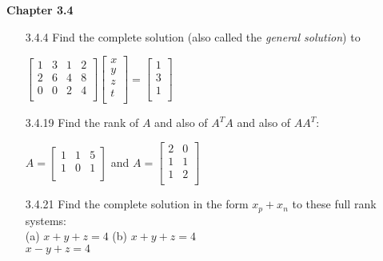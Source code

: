 \documentclass[10pt,twoside,reqno]{article}
\begin{document}
\begin{enumerate}
\end{enumerate}
\vspace{5mm}
\textbf{Chapter 3.4}
\begin{enumerate}
\item[3.4.4] Find the complete solution (also called the \textit{general solution}) to\\
\vspace{3mm}
\begin{center}
$
$$
\begin{bmatrix}
1&3&1&2\\
2&6&4&8\\
0&0&2&4\\
\end{bmatrix}
\begin{bmatrix}
x\\
y\\
z\\
t\\
\end{bmatrix}
=
\begin{bmatrix}
1\\
3\\
1\\
\end{bmatrix}
$$
$
\end{center}
\vspace{3mm}



\item[3.4.19] Find the rank of $A$ and also of $A^TA$ and also of $AA^T$:
\begin{center}
$
$$
A =
\begin{bmatrix}
1&1&5\\
1&0&1\\
\end{bmatrix}
$$
$
and
$
$$
A =
\begin{bmatrix}
2&0\\
1&1\\
1&2\\
\end{bmatrix}
$$
$
\end{center}
\vspace{3mm} 



\item[3.4.21] Find the complete solution in the form $x_p + x_n$ to these full rank systems:\\
\vspace{3mm}
(a) $x + y + z = 4$ \hspace{5mm} (b) $x + y + z = 4$\\
\hspace{38mm} $x - y + z = 4$\\
\vspace{3mm}




\end{enumerate}
\end{document}

